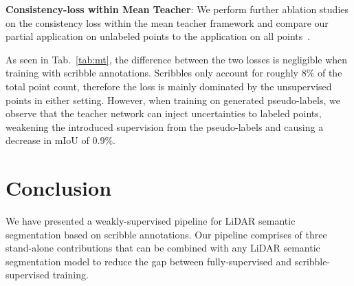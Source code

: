 \documentclass[10pt,twocolumn,letterpaper]{article}
\begin{document}
\begin{table}[t]
    \centering
    \tabcolsep=0.11cm
    \caption{Compared is the application of the consistency-loss on all points~\cite{cvpr2020towards10x} to our proposed partial application on only unlabeled points. We conduct experiments using the mean teacher pipeline with scribble annotations ($8\%$) and CRB pseudo-labels ($50\%$).} 
    \label{tab:mt}
    \vspace{-10px}
\end{table}

\noindent \textbf{Consistency-loss within Mean Teacher}: We perform further ablation studies on the consistency loss within the mean teacher framework and compare our partial application on unlabeled points to the application on all points~\cite{cvpr2020towards10x}.

As seen in Tab.~\ref{tab:mt}, the difference between the two losses is negligible when training with scribble annotations. Scribbles only account for roughly $8\%$ of the total point count, therefore the loss is mainly dominated by the unsupervised points in either setting. However, when training on generated pseudo-labels, we observe that the teacher network can inject uncertainties to labeled points, weakening the introduced supervision from the pseudo-labels and causing a decrease in mIoU of $0.9\%$.

\section{Conclusion}

We have presented a weakly-supervised pipeline for LiDAR semantic segmentation based on scribble annotations. Our pipeline comprises of three stand-alone contributions that can be combined with any LiDAR semantic segmentation model to reduce the gap between fully-supervised and scribble-supervised training.
\end{document}
